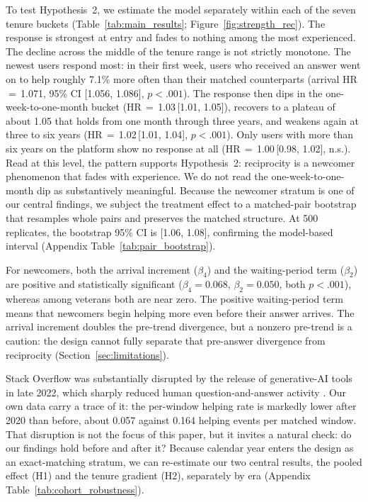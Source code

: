 To test Hypothesis~2, we estimate the model separately within each of the seven tenure buckets (Table~\ref{tab:main_results}; Figure~\ref{fig:strength_rec}). The response is strongest at entry and fades to nothing among the most experienced. The decline across the middle of the tenure range is not strictly monotone. The newest users respond most: in their first week, users who received an answer went on to help roughly 7.1\% more often than their matched counterparts (arrival HR\,$=$\,1.071, 95\% CI [1.056, 1.086], $p < .001$). The response then dips in the one-week-to-one-month bucket (HR\,$=$\,1.03\,[1.01, 1.05]), recovers to a plateau of about 1.05 that holds from one month through three years, and weakens again at three to six years (HR\,$=$\,1.02\,[1.01, 1.04], $p<.001$). Only users with more than six years on the platform show no response at all (HR\,$=$\,1.00\,[0.98, 1.02], n.s.). Read at this level, the pattern supports Hypothesis~2: reciprocity is a newcomer phenomenon that fades with experience. We do not read the one-week-to-one-month dip as substantively meaningful. Because the newcomer stratum is one of our central findings, we subject the treatment effect to a matched-pair bootstrap that resamples whole pairs and preserves the matched structure. At 500 replicates, the bootstrap 95\% CI is [1.06, 1.08], confirming the model-based interval (Appendix Table~\ref{tab:pair_bootstrap}).

For newcomers, both the arrival increment ($\beta_4$) and the waiting-period term ($\beta_2$) are positive and statistically significant ($\beta_4=0.068$, $\beta_2=0.050$, both $p<.001$), whereas among veterans both are near zero. The positive waiting-period term means that newcomers begin helping more even before their answer arrives. The arrival increment doubles the pre-trend divergence, but a nonzero pre-trend is a caution: the design cannot fully separate that pre-answer divergence from reciprocity (Section~\ref{sec:limitations}).

Stack Overflow was substantially disrupted by the release of generative-AI tools in late 2022, which sharply reduced human question-and-answer activity \citep{delriochanona_large_2024, burtch_consequences_2024}. Our own data carry a trace of it: the per-window helping rate is markedly lower after 2020 than before, about 0.057 against 0.164 helping events per matched window. That disruption is not the focus of this paper, but it invites a natural check: do our findings hold before and after it? Because calendar year enters the design as an exact-matching stratum, we can re-estimate our two central results, the pooled effect (H1) and the tenure gradient (H2), separately by era (Appendix Table~\ref{tab:cohort_robustness}).

